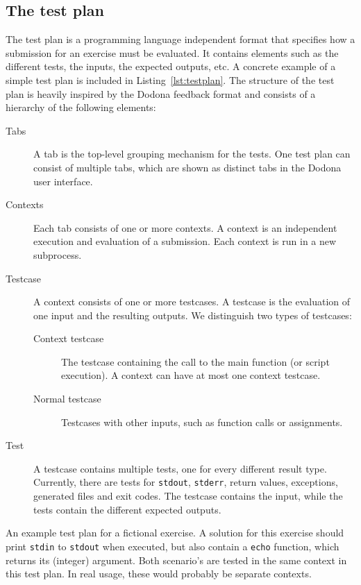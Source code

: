 \documentclass[5p,number]{elsarticle}
\begin{document}
    \subsection{The test plan}\label{subsec:the-test-plan}

    The test plan is a programming language independent format that specifies how a submission for an exercise must be evaluated.
    It contains elements such as the different tests, the inputs, the expected outputs, etc.
    A concrete example of a simple test plan is included in Listing~\ref{lst:testplan}.
    The structure of the test plan is heavily inspired by the Dodona  feedback format and consists of a hierarchy of the following elements:

    \begin{description}
        \item[Tabs] A tab is the top-level grouping mechanism for the tests.
        One test plan can consist of multiple tabs, which are shown as distinct tabs in the Dodona user interface.
        \item[Contexts] Each tab consists of one or more contexts.
        A context is an independent execution and evaluation of a submission.
        Each context is run in a new subprocess.
        \item[Testcase] A context consists of one or more testcases.
        A testcase is the evaluation of one input and the resulting outputs.
        We distinguish two types of testcases:
        \begin{description}
            \item[Context testcase] The testcase containing the call to the main function (or script execution).
            A context can have at most one context testcase.
            \item[Normal testcase] Testcases with other inputs, such as function calls or assignments.
        \end{description}
        \item[Test] A testcase contains multiple tests, one for every different result type.
        Currently, there are tests for \texttt{stdout}, \texttt{stderr}, return values, exceptions, generated files and exit codes.
        The testcase contains the input, while the tests contain the different expected outputs.
    \end{description}

    \begin{listing}
        \caption{
        An example test plan for a fictional exercise.
        A solution for this exercise should print \texttt{stdin} to \texttt{stdout} when executed, but also contain a \texttt{echo} function, which returns its (integer) argument.
        Both scenario's are tested in the same context in this test plan.
        In real usage, these would probably be separate contexts.
        }
        \inputminted[fontsize=\small]{json}{code/extended-plan.tson}
        \label{lst:testplan}
    \end{listing}
\end{document}
